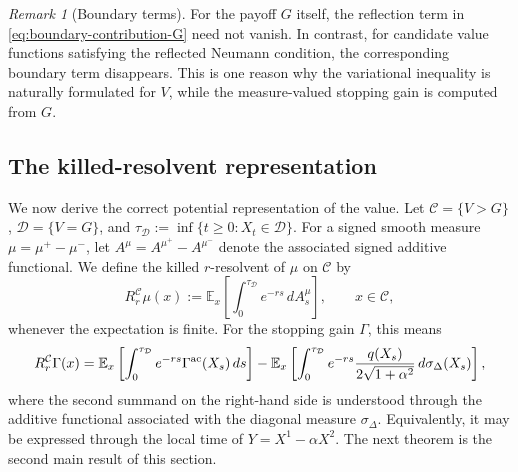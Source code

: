 \documentclass[pdflatex,sn-mathphys-num]{sn-jnl}
\theoremstyle{plain}
\theoremstyle{definition}
\theoremstyle{remark}
\newtheorem{remark}[theorem]{Remark}
\numberwithin{equation}{section}
\begin{document}
\begin{remark}[Boundary terms] \label{rem:boundary-terms} 
For the payoff \(G\) itself, the reflection term in \eqref{eq:boundary-contribution-G} need not vanish. In contrast, for candidate value functions satisfying the reflected Neumann condition, the corresponding boundary term disappears. This is one reason why the variational inequality is naturally formulated for \(V\), while the measure-valued stopping gain is computed from \(G\). 
\end{remark} 

\subsection{The killed-resolvent representation} \label{subsec:killed-resolvent-representation} 

We now derive the correct potential representation of the value. Let 
$\mathcal C=\{V>G\}$, $\mathcal D=\{V=G\}$, 
and 
$\tau_{\mathcal D}:=\inf\{t\ge0:X_t\in\mathcal D\}$. 
For a signed smooth measure \(\mu=\mu^+-\mu^-\), let \(A^\mu=A^{\mu^+}-A^{\mu^-}\) denote the associated signed additive functional. We define the killed \(r\)-resolvent of \(\mu\) on \(\mathcal C\) by 
\[
R_r^{\mathcal C}\mu(x) := \mathbb E_x \left[ \int_0^{\tau_{\mathcal D}}e^{-rs}\,dA_s^\mu \right], \qquad x\in\mathcal C, 
\]
whenever the expectation is finite. For the stopping gain \(\Gamma\), this means 
\[
R_r^{\mathcal C}\Gamma(x) = \mathbb E_x \left[ \int_0^{\tau_{\mathcal D}}e^{-rs} \Gamma^{\rm ac}(X_s)\,ds \right] 
- \mathbb E_x \left[ \int_0^{\tau_{\mathcal D}}e^{-rs} \frac{q(X_s)}{2\sqrt{1+\alpha^2}}\,d\sigma_\Delta(X_s) \right],
\]
where the second summand on the right-hand side is understood through the additive functional associated with the diagonal measure \(\sigma_\Delta\). Equivalently, it may be expressed through the local time of \(Y=X^1-\alpha X^2\). The next theorem is the second main result of this section. 
\end{document}
